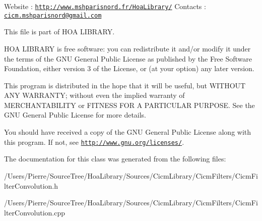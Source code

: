 Website \-: \href{http://www.mshparisnord.fr/HoaLibrary/}{\tt http\-://www.\-mshparisnord.\-fr/\-Hoa\-Library/} Contacts \-: \href{mailto:cicm.mshparisnord@gmail.com}{\tt cicm.\-mshparisnord@gmail.\-com}

This file is part of H\-O\-A L\-I\-B\-R\-A\-R\-Y.

H\-O\-A L\-I\-B\-R\-A\-R\-Y is free software\-: you can redistribute it and/or modify it under the terms of the G\-N\-U General Public License as published by the Free Software Foundation, either version 3 of the License, or (at your option) any later version.

This program is distributed in the hope that it will be useful, but W\-I\-T\-H\-O\-U\-T A\-N\-Y W\-A\-R\-R\-A\-N\-T\-Y; without even the implied warranty of M\-E\-R\-C\-H\-A\-N\-T\-A\-B\-I\-L\-I\-T\-Y or F\-I\-T\-N\-E\-S\-S F\-O\-R A P\-A\-R\-T\-I\-C\-U\-L\-A\-R P\-U\-R\-P\-O\-S\-E. See the G\-N\-U General Public License for more details.

You should have received a copy of the G\-N\-U General Public License along with this program. If not, see \href{http://www.gnu.org/licenses/}{\tt http\-://www.\-gnu.\-org/licenses/}. 

The documentation for this class was generated from the following files\-:\begin{DoxyCompactItemize}
\item 
/\-Users/\-Pierre/\-Source\-Tree/\-Hoa\-Library/\-Sources/\-Cicm\-Library/\-Cicm\-Filters/Cicm\-Filter\-Convolution.\-h\item 
/\-Users/\-Pierre/\-Source\-Tree/\-Hoa\-Library/\-Sources/\-Cicm\-Library/\-Cicm\-Filters/Cicm\-Filter\-Convolution.\-cpp\end{DoxyCompactItemize}

